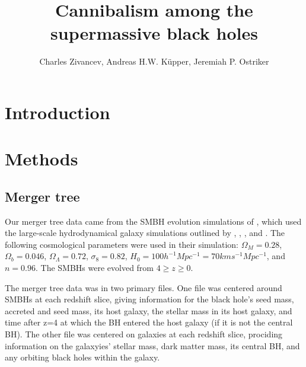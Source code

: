 \documentclass[english, apj]{emulateapj}
\begin{document}
\title{Cannibalism among the supermassive black holes}


\author{Charles Zivancev, Andreas H.W. K\"upper, Jeremiah P. Ostriker}




\begin{abstract}

\end{abstract}






\section{Introduction}\label{sec:introduction}



\section{Methods}\label{sec:methods}


\subsection{Merger tree}
Our merger tree data came from the SMBH evolution simulations of \citet{2015ApJ...799..178K}, which used the large-scale hydrodynamical galaxy simulations outlined by \citet{2011ApJ...741...99C}, \citet{2011ApJ...742L..33C}, \citet{2012ApJ...753...17C}, \citet{2012ApJ...748..121C} and \citet{2013ApJ...770..139C}.  The following cosmological parameters were used in their simulation:   $\Omega_M = 0.28$, $\Omega_b = 0.046$, $\Omega_\Lambda = 0.72$, $\sigma_8 = 0.82$, $H_0 = 100h^{-1}Mpc^{-1} = 70 km s^{-1} Mpc^{-1}$, and $n = 0.96$.  The SMBHs were evolved from $4\geq z \geq 0$.

The merger tree data was in two primary files.  One file was centered around SMBHs at each redshift slice, giving information for the black hole's seed mass, accreted and seed mass, its host galaxy, the stellar mass in its host galaxy, and time after z=4 at which the BH entered the host galaxy (if it is not the central BH).  The other file was centered on galaxies at each redshift slice, prociding information on the galaxyies' stellar mass, dark matter mass, its central BH, and any orbiting black holes within the galaxy.
\end{document}
